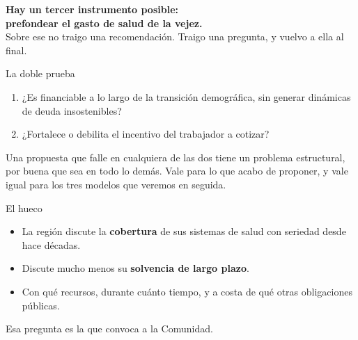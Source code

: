 \documentclass[aspectratio=169,11pt]{beamer}
\newcommand{\clave}[1]{\textcolor{acento}{\textbf{#1}}}
\newcommand{\cierre}[1]{\vspace{0.5em}\par{#1}}
\begin{document}
\begin{frame}[plain]
  \vfill
  \begin{center}
    \colorbox{banda}{\parbox{0.88\textwidth}{\vspace{1.0em}\centering
      \large\textbf{\textcolor{acento}{Hay un tercer instrumento posible:\\[0.3em]prefondear el gasto de salud de la vejez.}}\\[0.7em]
      \normalsize Sobre ese no traigo una recomendación. Traigo una pregunta, y vuelvo a ella al final.
      \vspace{1.0em}}}
  \end{center}
  \vfill
\end{frame}


\begin{frame}{La doble prueba}
  \begin{enumerate}
    \item ¿Es financiable a lo largo de la transición demográfica, sin generar dinámicas de deuda insostenibles?
    \item ¿Fortalece o debilita el incentivo del trabajador a cotizar?
  \end{enumerate}
  \cierre{Una propuesta que falle en cualquiera de las dos tiene un problema estructural, por buena que sea en todo lo demás. Vale para lo que acabo de proponer, y vale igual para los tres modelos que veremos en seguida.}
\end{frame}


\begin{frame}{El hueco}
  \begin{itemize}
    \item La región discute la \clave{cobertura} de sus sistemas de salud con seriedad desde hace décadas.
    \item Discute mucho menos su \clave{solvencia de largo plazo}.
    \item Con qué recursos, durante cuánto tiempo, y a costa de qué otras obligaciones públicas.
  \end{itemize}
  \cierre{Esa pregunta es la que convoca a la Comunidad.}
\end{frame}
\end{document}
